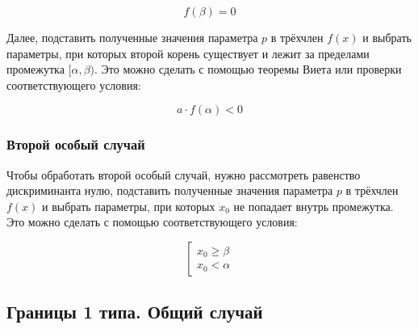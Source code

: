 \begin {equation*}
    f(\beta) = 0
\end {equation*}


Далее, подставить полученные значения параметра $p$ в трёхчлен $f(x)$ и выбрать параметры, при
которых второй корень существует и лежит за пределами промежутка $[\alpha, \beta)$.  Это можно
сделать с помощью теоремы Виета или проверки соответствующего условия:

       $$ a \cdot f(\alpha) < 0 $$

\subsubsection {Второй особый случай}

Чтобы обработать второй особый случай, нужно рассмотреть равенство дискриминанта нулю, подставить
полученные значения параметра $p$ в трёхчлен $f(x)$ и выбрать параметры, при которых $x_0$ не
попадает внутрь промежутка. Это можно сделать с помощью соответствующего условия:

\begin {equation*}
    \left[
        \begin {aligned}
            x_0 \geqslant \beta
            \\
            x_0 < \alpha
        \end {aligned}
    \right.
\end {equation*}

\subsection {Границы 1 типа. Общий случай}

